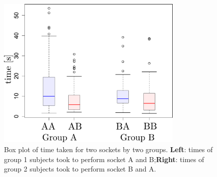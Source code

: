\begin{figure}
  \includegraphics[width=0.8\textwidth]{./ch4-PiH/Figures/Group_Socket.pdf}
   \caption{Box plot of time taken for two sockets by two groups. \textbf{Left}: times of group 1 subjects took to perform socket A and B;\textbf{Right}: times of group 2 subjects took to perform socket B and A. }
   \label{figuretimesubgroup}
\end{figure}

  
% 

 

